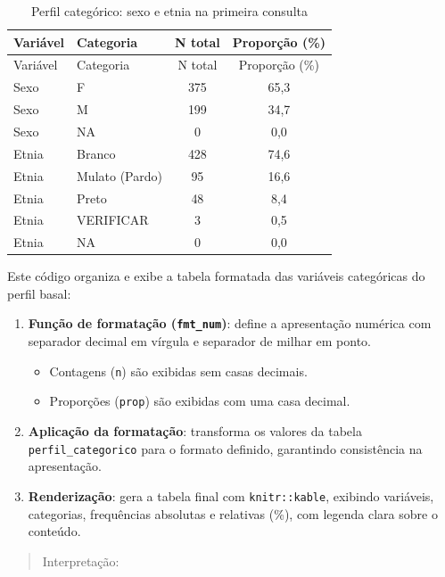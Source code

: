 \documentclass[
]{article}
\providecommand{\tightlist}{%
  \setlength{\itemsep}{0pt}\setlength{\parskip}{0pt}}\usepackage{longtable,booktabs,array}
\begin{document}
\begin{longtable}[]{@{}llcc@{}}
\caption{Perfil categórico: sexo e etnia na primeira
consulta}\tabularnewline
\toprule\noalign{}
Variável & Categoria & N total & Proporção (\%) \\
\midrule\noalign{}
\endfirsthead
\toprule\noalign{}
Variável & Categoria & N total & Proporção (\%) \\
\midrule\noalign{}
\endhead
\bottomrule\noalign{}
\endlastfoot
Sexo & F & 375 & 65,3 \\
Sexo & M & 199 & 34,7 \\
Sexo & NA & 0 & 0,0 \\
Etnia & Branco & 428 & 74,6 \\
Etnia & Mulato (Pardo) & 95 & 16,6 \\
Etnia & Preto & 48 & 8,4 \\
Etnia & VERIFICAR & 3 & 0,5 \\
Etnia & NA & 0 & 0,0 \\
\end{longtable}

Este código organiza e exibe a tabela formatada das variáveis
categóricas do perfil basal:

\begin{enumerate}
\def\labelenumi{\arabic{enumi}.}
\item
  \textbf{Função de formatação (\texttt{fmt\_num})}: define a
  apresentação numérica com separador decimal em vírgula e separador de
  milhar em ponto.

  \begin{itemize}
  \tightlist
  \item
    Contagens (\texttt{n}) são exibidas sem casas decimais.\\
  \item
    Proporções (\texttt{prop}) são exibidas com uma casa decimal.
  \end{itemize}
\item
  \textbf{Aplicação da formatação}: transforma os valores da tabela
  \texttt{perfil\_categorico} para o formato definido, garantindo
  consistência na apresentação.
\item
  \textbf{Renderização}: gera a tabela final com \texttt{knitr::kable},
  exibindo variáveis, categorias, frequências absolutas e relativas
  (\%), com legenda clara sobre o conteúdo.
\end{enumerate}

\begin{quote}
Interpretação:
\end{quote}
\end{document}
